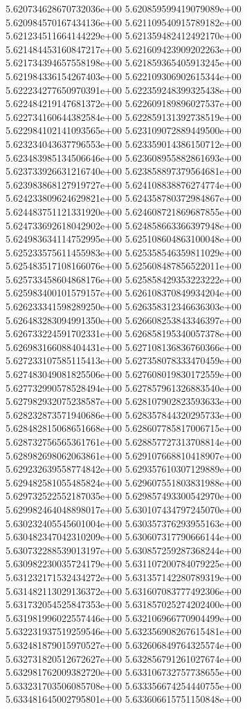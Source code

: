5.620734628670732036e+00
5.620859599419079089e+00
5.620984570167434136e+00
5.621109540915789182e+00
5.621234511664144229e+00
5.621359482412492170e+00
5.621484453160847217e+00
5.621609423909202263e+00
5.621734394657558198e+00
5.621859365405913245e+00
5.621984336154267403e+00
5.622109306902615344e+00
5.622234277650970391e+00
5.622359248399325438e+00
5.622484219147681372e+00
5.622609189896027537e+00
5.622734160644382584e+00
5.622859131392738519e+00
5.622984102141093565e+00
5.623109072889449500e+00
5.623234043637796553e+00
5.623359014386150712e+00
5.623483985134506646e+00
5.623608955882861693e+00
5.623733926631216740e+00
5.623858897379564681e+00
5.623983868127919727e+00
5.624108838876274774e+00
5.624233809624629821e+00
5.624358780372984867e+00
5.624483751121331920e+00
5.624608721869687855e+00
5.624733692618042902e+00
5.624858663366397948e+00
5.624983634114752995e+00
5.625108604863100048e+00
5.625233575611455983e+00
5.625358546359811029e+00
5.625483517108166076e+00
5.625608487856522011e+00
5.625733458604868176e+00
5.625858429353223222e+00
5.625983400101579157e+00
5.626108370849934204e+00
5.626233341598289250e+00
5.626358312346636303e+00
5.626483283094991350e+00
5.626608253843346397e+00
5.626733224591702331e+00
5.626858195340057378e+00
5.626983166088404431e+00
5.627108136836760366e+00
5.627233107585115413e+00
5.627358078333470459e+00
5.627483049081825506e+00
5.627608019830172559e+00
5.627732990578528494e+00
5.627857961326883540e+00
5.627982932075238587e+00
5.628107902823593633e+00
5.628232873571940686e+00
5.628357844320295733e+00
5.628482815068651668e+00
5.628607785817006715e+00
5.628732756565361761e+00
5.628857727313708814e+00
5.628982698062063861e+00
5.629107668810418907e+00
5.629232639558774842e+00
5.629357610307129889e+00
5.629482581055485824e+00
5.629607551803831988e+00
5.629732522552187035e+00
5.629857493300542970e+00
5.629982464048898017e+00
5.630107434797245070e+00
5.630232405545601004e+00
5.630357376293955163e+00
5.630482347042310209e+00
5.630607317790666144e+00
5.630732288539013197e+00
5.630857259287368244e+00
5.630982230035724179e+00
5.631107200784079225e+00
5.631232171532434272e+00
5.631357142280789319e+00
5.631482113029136372e+00
5.631607083777492306e+00
5.631732054525847353e+00
5.631857025274202400e+00
5.631981996022557446e+00
5.632106966770904499e+00
5.632231937519259546e+00
5.632356908267615481e+00
5.632481879015970527e+00
5.632606849764325574e+00
5.632731820512672627e+00
5.632856791261027674e+00
5.632981762009382720e+00
5.633106732757738655e+00
5.633231703506085708e+00
5.633356674254440755e+00
5.633481645002795801e+00
5.633606615751150848e+00
